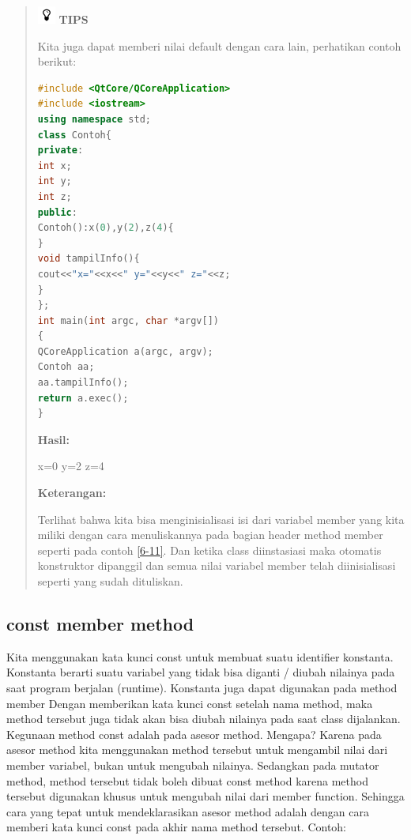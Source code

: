 \begin{quotation}
\includegraphics{../manuscript/images/tips}	\textbf{TIPS} 
	
	Kita juga
	dapat memberi nilai default dengan cara lain, perhatikan contoh berikut:
	
\begin{lstlisting}[language=c++, caption=Memberi nilai default pada constructor, label=contoh6-11]
#include <QtCore/QCoreApplication>
#include <iostream>
using namespace std;
class Contoh{
private:
int x;
int y;
int z;
public:
Contoh():x(0),y(2),z(4){
}
void tampilInfo(){
cout<<"x="<<x<<" y="<<y<<" z="<<z;
}
};
int main(int argc, char *argv[])
{
QCoreApplication a(argc, argv);
Contoh aa;
aa.tampilInfo();
return a.exec();
}
\end{lstlisting}
	
	\textbf{Hasil:}
	
\begin{lcverbatim}
x=0 y=2 z=4
\end{lcverbatim}
	
	\textbf{Keterangan:}
	
	Terlihat bahwa kita bisa menginisialisasi isi dari variabel member yang
	kita miliki dengan cara menuliskannya pada bagian header method member
	seperti pada contoh \ref{6-11}. Dan ketika class diinstasiasi maka otomatis
	konstruktor dipanggil dan semua nilai variabel member telah
	diinisialisasi seperti yang sudah dituliskan.
\end{quotation}


\subsection{const member method}\label{const-member-method}

Kita menggunakan kata kunci const untuk membuat suatu identifier
konstanta. Konstanta berarti suatu variabel yang tidak bisa diganti /
diubah nilainya pada saat program berjalan (runtime). Konstanta juga
dapat digunakan pada method member Dengan memberikan kata kunci const
setelah nama method, maka method tersebut juga tidak akan bisa diubah
nilainya pada saat class dijalankan. Kegunaan method const adalah pada
asesor method. Mengapa? Karena pada asesor method kita menggunakan
method tersebut untuk mengambil nilai dari member variabel, bukan untuk
mengubah nilainya. Sedangkan pada mutator method, method tersebut tidak
boleh dibuat const method karena method tersebut digunakan khusus untuk
mengubah nilai dari member function. Sehingga cara yang tepat untuk
mendeklarasikan asesor method adalah dengan cara memberi kata kunci
const pada akhir nama method tersebut. Contoh:

